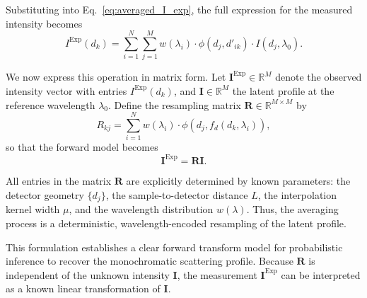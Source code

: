 \documentclass[12pt]{article}
\begin{document}
Substituting into Eq.~\eqref{eq:averaged_I_exp}, the full expression for the measured intensity becomes
\begin{equation}
    I^{\mathrm{Exp}}(d_k) = \sum_{i=1}^N \sum_{j=1}^M w(\lambda_i) \cdot \phi(d_j, d'_{ik}) \cdot I(d_j, \lambda_0).
    \label{eq:double_sum}
\end{equation}

We now express this operation in matrix form. Let \( \mathbf{I}^{\mathrm{Exp}} \in \mathbb{R}^M \) denote the observed intensity vector with entries \( I^{\mathrm{Exp}}(d_k) \), and \( \mathbf{I} \in \mathbb{R}^M \) the latent profile at the reference wavelength \( \lambda_0 \). Define the resampling matrix \( \mathbf{R} \in \mathbb{R}^{M \times M} \) by
\begin{equation}
    R_{kj} = \sum_{i=1}^N w(\lambda_i) \cdot \phi(d_j, f_d(d_k, \lambda_i)),
    \label{eq:R_matrix}
\end{equation}
so that the forward model becomes
\begin{equation}
    \mathbf{I}^{\mathrm{Exp}} = \mathbf{R} \mathbf{I}.
    \label{eq:forward_matrix}
\end{equation}

All entries in the matrix \( \mathbf{R} \) are explicitly determined by known parameters: the detector geometry \( \{ d_j \} \), the sample-to-detector distance \( L \), the interpolation kernel width \( \mu \), and the wavelength distribution \( w(\lambda) \). Thus, the averaging process is a deterministic, wavelength-encoded resampling of the latent profile. 

This formulation establishes a clear forward transform model for probabilistic inference to recover the monochromatic scattering profile. Because \( \mathbf{R} \) is independent of the unknown intensity \( \mathbf{I} \), the measurement \( \mathbf{I}^{\mathrm{Exp}} \) can be interpreted as a known linear transformation of \( \mathbf{I} \). 
\end{document}
